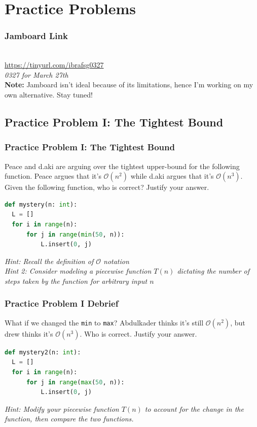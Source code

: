 \documentclass[hyperref={colorlinks,citecolor=blue,linkcolor=blue,urlcolor=blue}, aspectratio=1610]{beamer}
\begin{document}
\section{Practice Problems}

\begin{frame}
  \frametitle{Jamboard Link}
  \begin{center}
    \\
    \url{https://tinyurl.com/ibrafsg0327}\\
    \textit{0327 for March 27th}\\
    \textbf{Note:} Jamboard isn't ideal because of its limitations, hence I'm working on my own alternative. Stay tuned!
  \end{center}
\end{frame}

\subsection{Practice Problem I: The Tightest Bound} 
\begin{frame}[fragile]
  \frametitle{Practice Problem I: The Tightest Bound}
  Peace and d.aki are arguing over the tightest upper-bound for the following function. Peace argues that it's $\mathcal{O}(n^2)$ while d.aki argues that it's $\mathcal{O}(n^3)$. Given the following function, who is correct? Justify your answer.

  \begin{lstlisting}[language=Python,style=mystyle]
def mystery(n: int):
  L = []
  for i in range(n):
      for j in range(min(50, n)):
          L.insert(0, j)
  \end{lstlisting}

  \textit{Hint: Recall the definition of $\mathcal{O}$ notation}\\
  \textit{Hint 2: Consider modeling a piecewise function $T(n)$ dictating the number of steps taken by the function for arbitrary input $n$}\\
\end{frame}

\begin{frame}[fragile]
  
  \frametitle{Practice Problem I Debrief}
  What if we changed the \texttt{min} to \texttt{max}? Abdulkader thinks it's still $\mathcal{O}(n^2)$, but drew thinks it's $\mathcal{O}(n^3)$. Who is correct. Justify your answer.
  \begin{lstlisting}[language=Python,style=mystyle]
def mystery2(n: int):
  L = []
  for i in range(n):
      for j in range(max(50, n)):
          L.insert(0, j)
  \end{lstlisting}
  \textit{Hint: Modify your piecewise function $T(n)$ to account for the change in the function, then compare the two functions.}\\
\end{frame}
\end{document}
